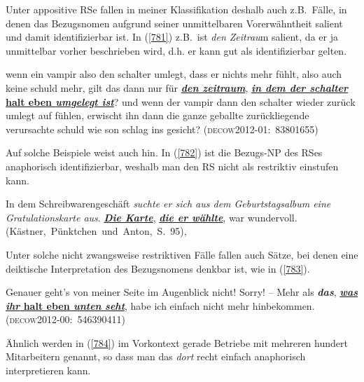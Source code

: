 Unter appositive RSe fallen in meiner Klassifikation deshalb auch z.B.\ Fälle, in denen das Bezugsnomen aufgrund seiner unmittelbaren Vorerwähntheit salient und damit identifizierbar ist. In (\ref{781}) z.B.\ ist \textit{den Zeitrau}m salient, da er ja unmittelbar vorher beschrieben wird, d.h. er kann gut als identifizierbar gelten.
	
\begin{exe}
	\ex\label{781} 

	wenn ein vampir also den schalter umlegt, dass er nichts mehr fühlt, also auch keine schuld mehr, gilt das dann nur für \ul{\textbf{\textit{den zeitraum}}}, \ul{\textbf{\textit{in dem der schalter} halt eben \textit{umgelegt ist}}}? und wenn der vampir dann den schalter wieder zurück umlegt auf fühlen, erwischt ihn dann die ganze geballte zurückliegende verursachte schuld wie son schlag ins gesicht?                  
	\newline\hbox{}\hfill\hbox{\scshape(decow2012-01: 83801655)}
\end{exe}	       
Auf solche Beispiele weist auch \citet[115]{Mikame1998} hin. In (\ref{782}) ist die Bezugs-NP des RSes anaphorisch identifizierbar, weshalb man den RS nicht als restriktiv einstufen kann.
	
\begin{exe}
	\ex\label{782} 

	In dem Schreibwarengeschäft \textit{suchte er sich aus dem Geburtstagsalbum eine Gratulationskarte aus}. \ul{\textbf{\textit{Die Karte}}}, \ul{\textbf{\textit{die er wählte}}}, war wundervoll.               
	\newline\hbox{}\hfill\hbox{(Kästner, Pünktchen und Anton, S. 95), \citet[115]{Mikame1998}}
\end{exe}	
Unter solche nicht zwangsweise restriktiven Fälle fallen auch Sätze, bei denen eine deiktische Interpretation des Bezugsnomens denkbar ist, wie in (\ref{783}).

\begin{exe}
	\ex\label{783} 

	Genauer geht's von meiner Seite im Augenblick nicht! Sorry! – Mehr als \textbf{\textit{das}}, \textbf{\ul{\textit{was ihr} halt eben \textit{unten} \textit{seht}}}, habe ich einfach nicht mehr hinbekommen.              
	\hfill\hbox{\scshape(decow2012-00: 546390411)}
\end{exe}
Ähnlich werden in (\ref{784}) im Vorkontext gerade Betriebe mit mehreren hundert Mitarbeitern genannt, so dass man das \textit{dort} recht einfach anaphorisch interpretieren kann.

